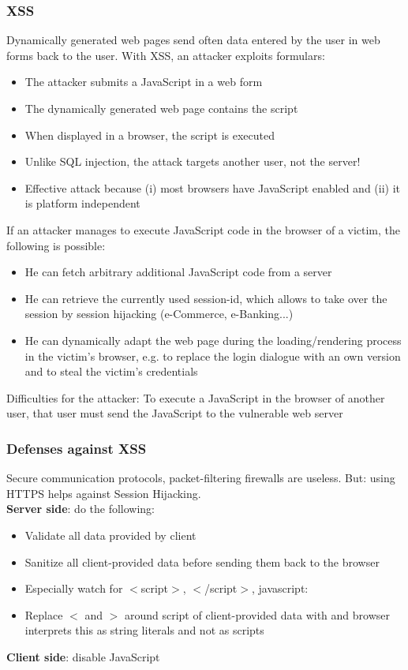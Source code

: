 \documentclass[10pt]{article}
\begin{document}
\subsubsection{XSS}
Dynamically generated web pages send often data entered by the user in web forms back to the user. With XSS, an attacker exploits formulars:
\begin{itemize}
	\item The attacker submits a JavaScript in a web form
	\item The dynamically generated web page contains the script
	\item When displayed in a browser, the script is executed
	\item Unlike SQL injection, the attack targets another user, not the server!
	\item Effective attack because (i) most browsers have JavaScript enabled and (ii) it is platform independent
\end{itemize}
If an attacker manages to execute JavaScript code in the browser of a victim, the following is possible:
\begin{itemize}
	\item He can fetch arbitrary additional JavaScript code from a server
	\item He can retrieve the currently used session-id, which allows to take over the session by session hijacking (e-Commerce, e-Banking...)
	\item He can dynamically adapt the web page during the loading/rendering process in the victim’s browser, e.g. to replace the login dialogue with an own version and to steal the victim’s credentials
\end{itemize}
Difficulties for the attacker: To execute a JavaScript in the browser of another user, that user must send the JavaScript to the vulnerable web server
\subsubsection{Defenses against XSS}
Secure communication protocols, packet-filtering firewalls are useless. But: using HTTPS helps against Session Hijacking. \\
\textbf{Server side}: do the following:
\begin{itemize}
	\item Validate all data provided by client
	\item Sanitize all client-provided data before sending them back to the browser
	\item Especially watch for $<$script$>$, $<$/script$>$, javascript:
	\item Replace $<$ and $>$ around script of client-provided data with and browser interprets this as string literals and not as scripts
\end{itemize}
\textbf{Client side}: disable JavaScript
\end{document}
